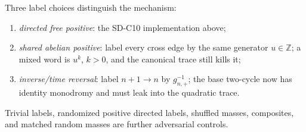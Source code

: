 Three label choices distinguish the mechanism:
\begin{enumerate}
 \item \emph{directed free positive}: the SD-C10 implementation above;
 \item \emph{shared abelian positive}: label every cross edge by the same
       generator $u\in\mathbb Z$; a mixed word is $u^k$, $k>0$, and the
       canonical trace still kills it;
 \item \emph{inverse/time reversal}: label $n+1\to n$ by
       $g_{n,+}^{-1}$; the base two-cycle now has identity monodromy and must
       leak into the quadratic trace.
\end{enumerate}
Trivial labels, randomized positive directed labels, shuffled masses,
composites, and matched random masses are further adversarial controls.
